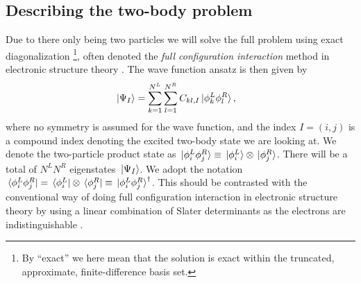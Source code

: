 \documentclass[twocolumn,superscriptaddress,unsortedaddress,
 amsmath,amssymb,
 aps,
]{revtex4-2}
\begin{document}
    \subsection{Describing the two-body problem}
        Due to there only being two particles we will solve the full problem
        using exact diagonalization \footnote{
            By ``exact'' we here mean that the solution is exact within the
            truncated, approximate, finite-difference basis set.
        }, often denoted the \emph{full configuration interaction} method
        in electronic structure theory \cite{the-pink-book}.
        The wave function ansatz is then given by
        \begin{align*}
            \ket*{\Psi_I}
            &= \sum_{k = 1}^{N^L} \sum_{l = 1}^{N^R} C_{kl, I}
            \ket*{\phi^{L}_k \phi^{R}_l},
        \end{align*}
        where no symmetry is assumed for the wave function, and the index
        $I = (i, j)$ is a compound index denoting the excited two-body
        state we are looking at.
        We denote the two-particle product state as $\ket*{\phi^L_i \phi^R_j}
        \equiv \ket*{\phi^L_i} \otimes \ket*{\phi^R_j}$.
        There will be a total of $N^L N^R$ eigenstates $\ket*{\Psi_I}$.
        We adopt the notation $\bra*{\phi^L_i \phi^R_j}
        = \bra*{\phi^L_i} \otimes \bra*{\phi^R_j}
        \equiv \ket*{\phi^L_i \phi^R_j}^{\dagger}$.
        This should be contrasted with the conventional way of doing full
        configuration interaction in electronic structure theory by using
        a linear combination of Slater determinants as the electrons are
        indistinguishable \cite{the-pink-book}.
\end{document}
